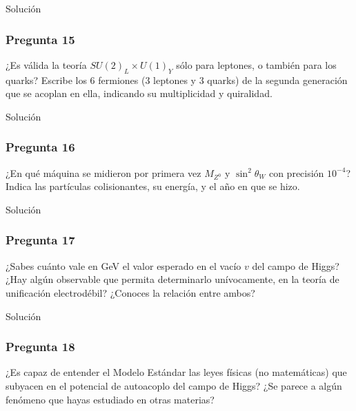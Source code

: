Solución

\vspace*{2em}

\begin{Enunciado}
	\subsubsection*{Pregunta 15}

	¿Es válida la teoría $SU(2)_L \times U(1)_Y$ sólo para leptones, o también para los quarks? Escribe los 6 fermiones (3 leptones y 3 quarks) de la segunda generación que se acoplan en ella, indicando su multiplicidad y quiralidad.

\end{Enunciado}

Solución

\vspace*{2em}

\begin{Enunciado}
	\subsubsection*{Pregunta 16}

	¿En qué máquina se midieron por primera vez $M_{Z^0}$ y $\sin^2\theta_W$ con precisión $10^{-4}$? Indica las partículas colisionantes, su energía, y el año en que se hizo.

\end{Enunciado}

Solución

\vspace*{2em}

\begin{Enunciado}
	\subsubsection*{Pregunta 17}

	¿Sabes cuánto vale en GeV el valor esperado en el vacío $v$ del campo de Higgs? ¿Hay algún observable que permita determinarlo unívocamente, en la teoría de unificación electrodébil? ¿Conoces la relación entre ambos?

\end{Enunciado}

Solución

\vspace*{2em}

\begin{Enunciado}
	\subsubsection*{Pregunta 18}

	¿Es capaz de entender el Modelo Estándar las leyes físicas (no matemáticas) que subyacen en el potencial de autoacoplo del campo de Higgs? ¿Se parece a algún fenómeno que hayas estudiado en otras materias?

\end{Enunciado}

